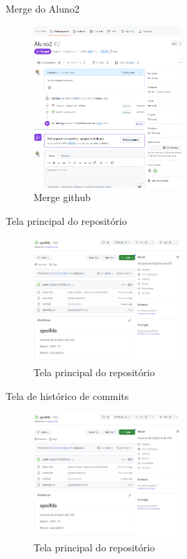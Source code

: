 \documentclass{beamer}
\begin{document}
\begin{frame}[fragile]{Merge do Aluno2}
      \begin{figure}[H]
            \centerline{\includegraphics[width=0.5\textwidth]{assets/aula-tdsi-ifds-2023-06-20/Captura de tela 2023-06-19 024520.png}}
            \caption{Merge github}
        \end{figure}
\end{frame}

\begin{frame}[fragile]{Tela principal do repositório}
      \begin{figure}[H]
            \centerline{\includegraphics[width=0.5\textwidth]{assets/aula-tdsi-ifds-2023-06-20/Captura de tela 2023-06-19 025033.png}}
            \caption{Tela principal do repositório}
        \end{figure}
\end{frame}

\begin{frame}[fragile]{Tela de histórico de commits}
      \begin{figure}[H]
            \centerline{\includegraphics[width=0.5\textwidth]{assets/aula-tdsi-ifds-2023-06-20/Captura de tela 2023-06-19 025033.png}}
            \caption{Tela principal do repositório}
        \end{figure}
\end{frame}
\end{document}
